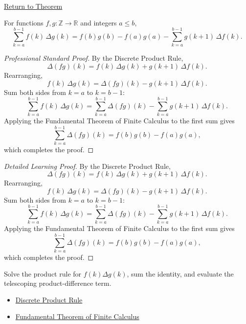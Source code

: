 \newpage
{}
\label{prf:summation-by-parts}

\begin{remark*}[Return]
\hyperref[thm:summation-by-parts]{Return to Theorem}
\end{remark*}

\begin{theorem*}
For functions \(f, g : \mathbb{Z} \to \mathbb{R}\) and integers \(a \le b\),
\[
\sum_{k=a}^{b-1} f(k)\,\Delta g(k)
=
f(b)g(b)-f(a)g(a)
-
\sum_{k=a}^{b-1} g(k+1)\,\Delta f(k).
\]
\end{theorem*}

\begin{proof}[Professional Standard Proof]
\LRAProofBodyStart
By the Discrete Product Rule,
\[
\Delta(fg)(k) = f(k)\,\Delta g(k) + g(k+1)\,\Delta f(k).
\]
Rearranging,
\[
f(k)\,\Delta g(k) = \Delta(fg)(k) - g(k+1)\,\Delta f(k).
\]
Sum both sides from \(k = a\) to \(k = b-1\):
\[
\sum_{k=a}^{b-1} f(k)\,\Delta g(k)
=
\sum_{k=a}^{b-1} \Delta(fg)(k)
-
\sum_{k=a}^{b-1} g(k+1)\,\Delta f(k).
\]
Applying the Fundamental Theorem of Finite Calculus to the first sum gives
\[
\sum_{k=a}^{b-1} \Delta(fg)(k) = f(b)g(b) - f(a)g(a),
\]
which completes the proof.
\end{proof}

\begin{proof}[Detailed Learning Proof]
\LRAProofBodyStart
By the Discrete Product Rule,
\[
\Delta(fg)(k) = f(k)\,\Delta g(k) + g(k+1)\,\Delta f(k).
\]
Rearranging,
\[
f(k)\,\Delta g(k) = \Delta(fg)(k) - g(k+1)\,\Delta f(k).
\]
Sum both sides from \(k = a\) to \(k = b-1\):
\[
\sum_{k=a}^{b-1} f(k)\,\Delta g(k)
=
\sum_{k=a}^{b-1} \Delta(fg)(k)
-
\sum_{k=a}^{b-1} g(k+1)\,\Delta f(k).
\]
Applying the Fundamental Theorem of Finite Calculus to the first sum gives
\[
\sum_{k=a}^{b-1} \Delta(fg)(k) = f(b)g(b) - f(a)g(a),
\]
which completes the proof.
\end{proof}

\begin{remark*}
Solve the product rule for \(f(k)\Delta g(k)\), sum the identity, and
evaluate the telescoping product-difference term.
\end{remark*}

\begin{dependencies}
\begin{itemize}
  \item \hyperref[thm:discrete-product-rule]{Discrete Product Rule}
  \item \hyperref[thm:fundamental-theorem-finite-calculus]{Fundamental Theorem of Finite Calculus}
\end{itemize}
\end{dependencies}
\clearpage
